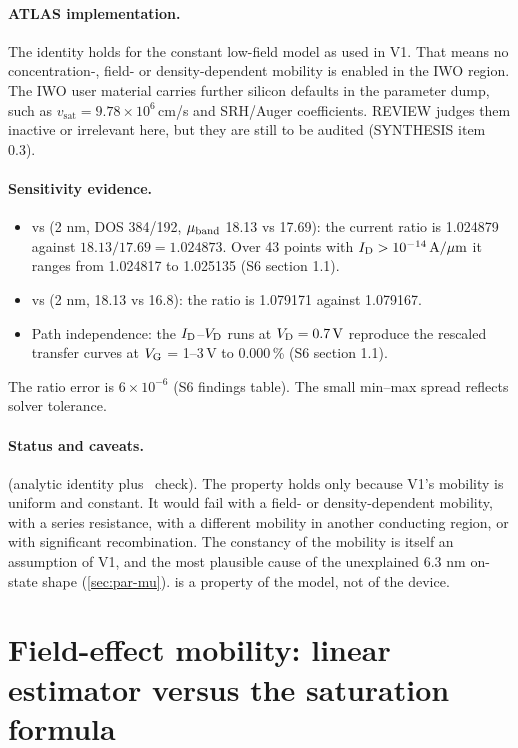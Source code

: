 \paragraph{ATLAS implementation.}
The identity holds for the constant low-field model \citep[p.~179]{AtlasManual} as used in V1. That means no concentration-, field- or density-dependent mobility is enabled in the IWO region. The IWO user material carries further silicon defaults in the parameter dump, such as $v_{\mathrm{sat}}=9.78\times10^{6}$\,cm/s and SRH/Auger coefficients. REVIEW judges them inactive or irrelevant here, but they are still to be audited (SYNTHESIS item 0.3).

\paragraph{Sensitivity evidence.}
\begin{itemize}
\item {} vs  (2 nm, DOS 384/192, $\mu_{\mathrm{band}}$ 18.13 vs 17.69): the current ratio is 1.024879 against $18.13/17.69=1.024873$. Over 43 points with $I_{\mathrm{D}}>10^{-14}\,\mathrm{A}/\mu\mathrm{m}$ it ranges from 1.024817 to 1.025135 (S6 section 1.1).
\item {} vs  (2 nm, 18.13 vs 16.8): the ratio is 1.079171 against 1.079167.
\item Path independence: the $I_{\mathrm{D}}$--$V_{\mathrm{D}}$ runs at $V_{\mathrm{D}}=\SI{0.7}{V}$ reproduce the rescaled transfer curves at $V_{\mathrm{G}}$ = 1--3\,V to 0.000\,\% (S6 section 1.1).
\end{itemize}
The ratio error is $6\times10^{-6}$ (S6 findings table). The small min--max spread reflects solver tolerance.

\paragraph{Status and caveats.}
 (analytic identity plus \evNUM\ check). The property holds only because V1's mobility is uniform and constant. It would fail with a field- or density-dependent mobility, with a series resistance, with a different mobility in another conducting region, or with significant recombination. The constancy of the mobility is itself an assumption of V1, and the most plausible cause of the unexplained 6.3 nm on-state shape (\cref{sec:par-mu}).  is a property of the model, not of the device.

\section{Field-effect mobility: linear estimator versus the saturation formula}\label{sec:der-mufe}

